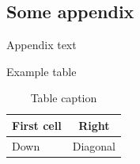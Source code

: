 \documentclass[12pt,oneside]{book}
\begin{document}
\begin{appendices}

\chapter{Some appendix}
Appendix text

Example table

\begin{table}[H]
\large
\centering
\caption{Table caption}
\begin{tabular}[H]{|l|c|}
\hline
First cell & Right \\ \hline
Down & Diagonal \\ \hline
\end{tabular}
\end{table}

\end{appendices}

\printindex 

\end{document}
